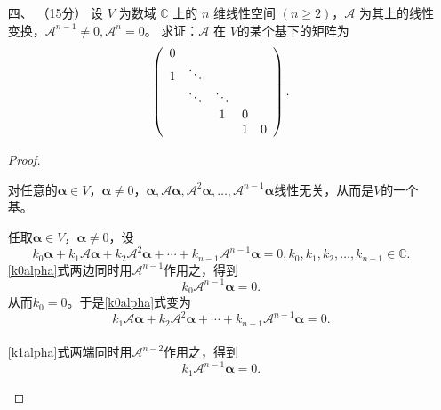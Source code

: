 \begin{enumerate}[1~]
\item[四、]（15分）
设 $V$ 为数域 $\mathbb{C}$ 上的 $n$ 维线性空间 $(n \ge 2)$，$\mathscr{A}$ 为其上的线性变换，$\mathscr{A}^{n-1}\ne 0, \mathscr{A}^{n} = 0$。 求证：$\mathscr{A}$ 在 $V$的某个基下的矩阵为\[
\left( \begin{array} { c c c c c } { 0 } & { } & { } & { } & { } \\ { 1 } & { \ddots } & { } & { } & { } \\ { } & { \ddots } & { \ddots } & { } & { } \\ { } & { } & { 1 } & { 0 } & { } \\ { } & { } & { } & { 1 } & { 0 } \end{array} \right).
\]
\begin{proof}
\begin{lemma}
对任意的$\boldsymbol{\alpha}\in V$，$\boldsymbol{\alpha}\ne0$，$\boldsymbol{\alpha}, \mathscr{A}\boldsymbol{\alpha}, \mathscr{A}^2\boldsymbol{\alpha}, \dots, \mathscr{A}^{n-1}\boldsymbol{\alpha}$线性无关，从而是$V$的一个基。
\end{lemma}
\begin{subproof}
任取$\boldsymbol{\alpha}\in V$，$\boldsymbol{\alpha}\ne0$，设
\begin{equation}\label{k0alpha}
k_0\boldsymbol{\alpha}+k_1\mathscr{A}\boldsymbol{\alpha}+k_2\mathscr{A}^2\boldsymbol{\alpha}+\cdots+k_{n-1}\mathscr{A}^{n-1}\boldsymbol{\alpha}=0, k_0, k_1, k_2, \dots, k_{n-1}\in \mathbb{C}.
\end{equation}
\ref{k0alpha}式两边同时用$\mathscr{A}^{n-1}$作用之，得到\[
k_0\mathscr{A}^{n-1}\boldsymbol{\alpha}=0.
\]
从而$k_0=0$。于是\ref{k0alpha}式变为\begin{equation}\label{k1alpha}
k_1\mathscr{A}\boldsymbol{\alpha}+k_2\mathscr{A}^2\boldsymbol{\alpha}+\cdots+k_{n-1}\mathscr{A}^{n-1}\boldsymbol{\alpha}=0.
\end{equation}
\\
\ref{k1alpha}式两端同时用$\mathscr{A}^{n-2}$作用之，得到\[
k_1\mathscr{A}^{n-1}\boldsymbol{\alpha}=0.
\]


\end{subproof}
\end{proof}
\end{enumerate}
